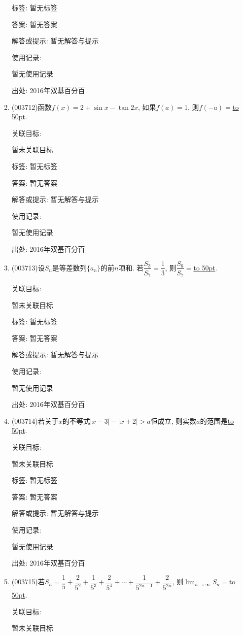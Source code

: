 \documentclass[10pt,a4paper]{article}
\newcommand{\blank}[1]{\underline{\hbox to #1pt{}}}
\begin{document}
\begin{enumerate}[1.]
标签: 暂无标签

答案: 暂无答案

解答或提示: 暂无解答与提示

使用记录:

暂无使用记录


出处: 2016年双基百分百
\item { (003712)}函数$f(x)=2+\sin x-\tan 2x$, 如果$f(a)=1$, 则$f(-a)=$\blank{50}.


关联目标:

暂未关联目标



标签: 暂无标签

答案: 暂无答案

解答或提示: 暂无解答与提示

使用记录:

暂无使用记录


出处: 2016年双基百分百
\item { (003713)}设$S_n$是等差数列$\{a_n\}$的前$n$项和. 若$\dfrac{S_3}{S_7}=\dfrac 13$, 则$\dfrac{S_6}{S_7}=$\blank{50}.


关联目标:

暂未关联目标



标签: 暂无标签

答案: 暂无答案

解答或提示: 暂无解答与提示

使用记录:

暂无使用记录


出处: 2016年双基百分百
\item { (003714)}若关于$x$的不等式$|x-3|-|x+2|>a$恒成立, 则实数$a$的范围是\blank{50}.


关联目标:

暂未关联目标



标签: 暂无标签

答案: 暂无答案

解答或提示: 暂无解答与提示

使用记录:

暂无使用记录


出处: 2016年双基百分百
\item { (003715)}若$S_n=\dfrac 15+\dfrac {2}{5^2}+\dfrac {1}{5^3}+\dfrac{2}{5^4}+\cdots+\dfrac{1}{5^{2n-1}}+\dfrac{2}{5^{2n}}$, 则$\displaystyle\lim_{n\to \infty}S_n=$\blank{50}.


关联目标:

暂未关联目标




\end{enumerate}
\end{document}
